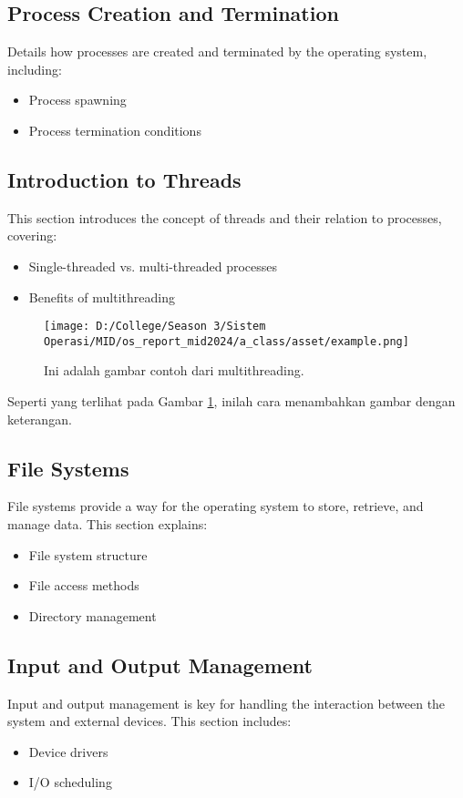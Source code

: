 \documentclass[12pt]{article}
\begin{document}
\subsection{Process Creation and Termination}
Details how processes are created and terminated by the operating system, including:
\begin{itemize}
    \item Process spawning
    \item Process termination conditions
\end{itemize}

\subsection{Introduction to Threads}
This section introduces the concept of threads and their relation to processes, covering:
\begin{itemize}
    \item Single-threaded vs. multi-threaded processes
    \item Benefits of multithreading
\end{itemize}

\begin{figure}[h]
    \centering
    \texttt{[image: D:/College/Season 3/Sistem Operasi/MID/os\_report\_mid2024/a\_class/asset/example.png]}  %
    \caption{Ini adalah gambar contoh dari multithreading.}
    \label{fig:contoh_gambar}
\end{figure}

Seperti yang terlihat pada Gambar \ref{fig:contoh_gambar}, inilah cara menambahkan gambar dengan keterangan.

\subsection{File Systems}
File systems provide a way for the operating system to store, retrieve, and manage data. This section explains:
\begin{itemize}
    \item File system structure
    \item File access methods
    \item Directory management
\end{itemize}

\subsection{Input and Output Management}
Input and output management is key for handling the interaction between the system and external devices. This section includes:
\begin{itemize}
    \item Device drivers
    \item I/O scheduling
\end{itemize}
\end{document}
